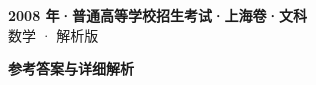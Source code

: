 \documentclass[zihao=-4, a4paper]{ctexart}
\begin{document}
\begin{center}
  {\Large\bfseries 2008 年·普通高等学校招生考试·上海卷·文科}\\[4pt]
  {\large 数学 · 解析版}
\end{center}
\medskip
{}

\clearpage
{}
\begin{center}{\Large\bfseries 参考答案与详细解析}\end{center}
\medskip

\end{document}
